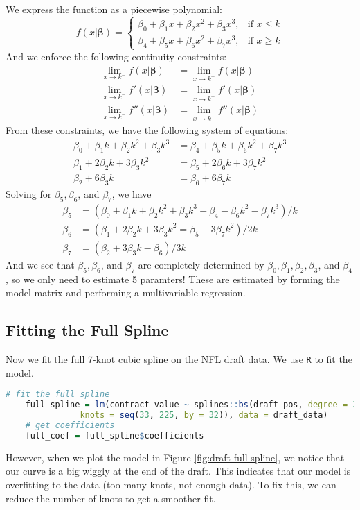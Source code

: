 \documentclass[twoside]{article}
\theoremstyle{definition}
\begin{document}
We express the function as a piecewise polynomial:
\begin{equation}
    f(x | \boldsymbol{\beta}) = \begin{cases}
        \beta_0 + \beta_1 x + \beta_2 x^2 + \beta_3 x^3, & \text{if } x \leq k \\
        \beta_4 + \beta_5 x + \beta_6 x^2 + \beta_7 x^3, & \text{if } x \geq k
    \end{cases}
\end{equation}
And we enforce the following continuity constraints:
\begin{align*}
    \lim_{x \to k^-} f(x | \boldsymbol{\beta}) &= \lim_{x \to k^+} f(x | \boldsymbol{\beta}) \\
    \lim_{x \to k^-} f'(x | \boldsymbol{\beta}) &= \lim_{x \to k^+} f'(x | \boldsymbol{\beta}) \\
    \lim_{x \to k^-} f''(x | \boldsymbol{\beta}) &= \lim_{x \to k^+} f''(x | \boldsymbol{\beta})
\end{align*}
From these constraints, we have the following system of equations:
\begin{align*}
    \beta_0 + \beta_1 k + \beta_2 k^2 + \beta_3 k^3 &= \beta_4 + \beta_5 k + \beta_6 k^2 + \beta_7 k^3 \\
    \beta_1 + 2\beta_2 k + 3\beta_3 k^2 &= \beta_5 + 2\beta_6 k + 3\beta_7 k^2 \\
    \beta_2 + 6\beta_3 k &= \beta_6 + 6\beta_7 k
\end{align*}
Solving for $\beta_5, \beta_6$, and $\beta_7$, we have
\begin{align*}
    \beta_5 &= (\beta_0 + \beta_1 k + \beta_2 k^2 + \beta_3 k^3 - \beta_4 - \beta_6 k^2 - \beta_7 k^3) / k \\
    \beta_6 &= (\beta_1 + 2 \beta_2 k + 3 \beta_3 k^2 = \beta_5 - 3\beta_7 k^2) / 2k \\
    \beta_7 &= (\beta_2 + 3 \beta_3 k - \beta_6) / 3k
\end{align*}
And we see that $\beta_5, \beta_6$, and $\beta_7$ are completely determined by $\beta_0, \beta_1, \beta_2, \beta_3$, and $\beta_4$, so we only need to estimate 5 paramters! These are estimated by forming the model matrix and performing a multivariable regression.

\subsection{Fitting the Full Spline}

Now we fit the full 7-knot cubic spline on the NFL draft data. We use \texttt{R} to fit the model.
\begin{lstlisting}[language=R]
    # fit the full spline
    full_spline = lm(contract_value ~ splines::bs(draft_pos, degree = 3,
               knots = seq(33, 225, by = 32)), data = draft_data)
    # get coefficients
    full_coef = full_spline$coefficients
\end{lstlisting}
However, when we plot the model in Figure \ref{fig:draft-full-spline}, we notice that our curve is a big wiggly at the end of the draft. This indicates that our model is overfitting to the data (too many knots, not enough data). To fix this, we can reduce the number of knots to get a smoother fit.
\end{document}
